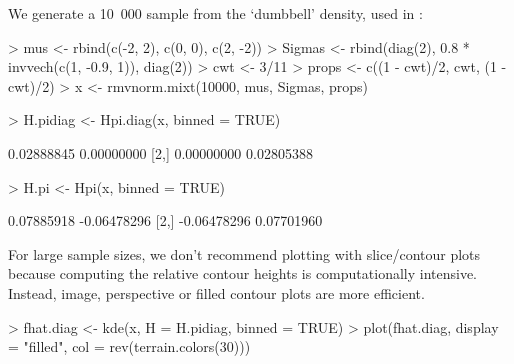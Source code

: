 \documentclass[a4paper,11pt]{article}
\begin{document}
We generate a 10~000 sample from the `dumbbell' density, used in 
\citet*{duong2005}:
\begin{Schunk}
\begin{Sinput}
> mus <- rbind(c(-2, 2), c(0, 0), c(2, -2))
> Sigmas <- rbind(diag(2), 0.8 * invvech(c(1, -0.9, 1)), diag(2))
> cwt <- 3/11
> props <- c((1 - cwt)/2, cwt, (1 - cwt)/2)
> x <- rmvnorm.mixt(10000, mus, Sigmas, props)
\end{Sinput}
\end{Schunk}
\begin{Schunk}
\begin{Sinput}
> H.pidiag <- Hpi.diag(x, binned = TRUE)
\end{Sinput}
\begin{Soutput}
           [,1]       [,2]
[1,] 0.02888845 0.00000000
[2,] 0.00000000 0.02805388
\end{Soutput}
\begin{Sinput}
> H.pi <- Hpi(x, binned = TRUE)
\end{Sinput}
\begin{Soutput}
            [,1]        [,2]
[1,]  0.07885918 -0.06478296
[2,] -0.06478296  0.07701960
\end{Soutput}
\end{Schunk}
For large sample sizes, we don't recommend plotting with slice/contour plots
because computing the relative contour heights is computationally intensive.
Instead, image, perspective or filled contour plots are more efficient.
\begin{Schunk}
\begin{Sinput}
> fhat.diag <- kde(x, H = H.pidiag, binned = TRUE)
> plot(fhat.diag, display = "filled", col = rev(terrain.colors(30)))
\end{Sinput}
\end{Schunk}
\end{document}
